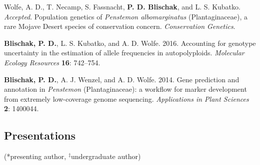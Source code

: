 \documentclass[]{article}
\begin{document}
\begin{etaremune}

\item
  Wolfe, A. D., T. Necamp, S. Fassnacht, \textbf{P. D. Blischak}, and L. S. Kubatko. \textit{Accepted}.
  Population genetics of \textit{Penstemon albomarginatus} (Plantaginaceae),
  a rare Mojave Desert species of conservation concern. \textit{Conservation Genetics}.

\item
  \textbf{Blischak, P. D.}, L. S. Kubatko, and A. D. Wolfe. 2016.
  Accounting for genotype uncertainty in the estimation of allele
  frequencies in autopolyploids. \emph{Molecular Ecology Resources} \textbf{16}:
  742--754.
\item
  \textbf{Blischak, P. D.}, A. J. Wenzel, and A. D. Wolfe. 2014. Gene
  prediction and annotation in \textit{Penstemon} (Plantaginaceae): a
  workflow for marker development from extremely low-coverage genome
  sequencing. \emph{Applications in Plant Sciences} \textbf{2}: 1400044.
\end{etaremune}

\subsection{\texorpdfstring{\textbf{Presentations}}{Presentations}}\label{presentations}

(*presenting author, \(^{\ddagger}\)undergraduate author)
\end{document}
